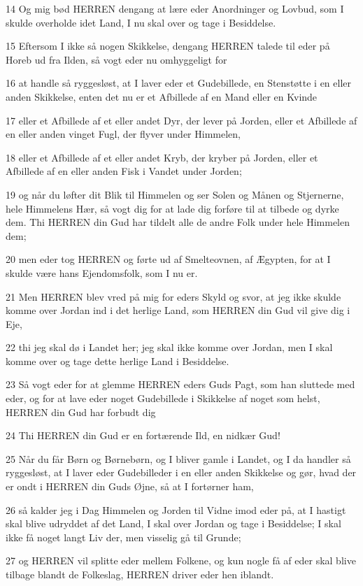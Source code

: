 \par 14 Og mig bød HERREN dengang at lære eder Anordninger og Lovbud, som I skulde overholde idet Land, I nu skal over og tage i Besiddelse.
\par 15 Eftersom I ikke så nogen Skikkelse, dengang HERREN talede til eder på Horeb ud fra Ilden, så vogt eder nu omhyggeligt for
\par 16 at handle så ryggesløst, at I laver eder et Gudebillede, en Stenstøtte i en eller anden Skikkelse, enten det nu er et Afbillede af en Mand eller en Kvinde
\par 17 eller et Afbillede af et eller andet Dyr, der lever på Jorden, eller et Afbillede af en eller anden vinget Fugl, der flyver under Himmelen,
\par 18 eller et Afbillede af et eller andet Kryb, der kryber på Jorden, eller et Afbillede af en eller anden Fisk i Vandet under Jorden;
\par 19 og når du løfter dit Blik til Himmelen og ser Solen og Månen og Stjernerne, hele Himmelens Hær, så vogt dig for at lade dig forføre til at tilbede og dyrke dem. Thi HERREN din Gud har tildelt alle de andre Folk under hele Himmelen dem;
\par 20 men eder tog HERREN og førte ud af Smelteovnen, af Ægypten, for at I skulde være hans Ejendomsfolk, som I nu er.
\par 21 Men HERREN blev vred på mig for eders Skyld og svor, at jeg ikke skulde komme over Jordan ind i det herlige Land, som HERREN din Gud vil give dig i Eje,
\par 22 thi jeg skal dø i Landet her; jeg skal ikke komme over Jordan, men I skal komme over og tage dette herlige Land i Besiddelse.
\par 23 Så vogt eder for at glemme HERREN eders Guds Pagt, som han sluttede med eder, og for at lave eder noget Gudebillede i Skikkelse af noget som helst, HERREN din Gud har forbudt dig
\par 24 Thi HERREN din Gud er en fortærende Ild, en nidkær Gud!
\par 25 Når du får Børn og Børnebørn, og I bliver gamle i Landet, og I da handler så ryggesløst, at I laver eder Gudebilleder i en eller anden Skikkelse og gør, hvad der er ondt i HERREN din Guds Øjne, så at I fortørner ham,
\par 26 så kalder jeg i Dag Himmelen og Jorden til Vidne imod eder på, at I hastigt skal blive udryddet af det Land, I skal over Jordan og tage i Besiddelse; I skal ikke få noget langt Liv der, men visselig gå til Grunde;
\par 27 og HERREN vil splitte eder mellem Folkene, og kun nogle få af eder skal blive tilbage blandt de Folkeslag, HERREN driver eder hen iblandt.
